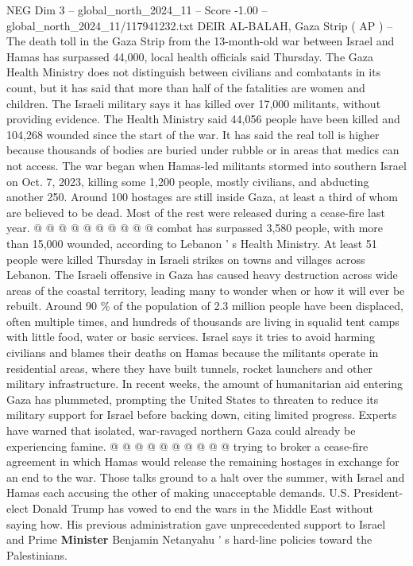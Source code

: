 \begin{textsample}{NEG Dim 3 – global\_north\_2024\_11 – Score -1.00 – global\_north\_2024\_11/117941232.txt}  \label{ex:f3_neg_277}
DEIR AL-BALAH, Gaza Strip ( AP ) -- The death toll in the Gaza Strip from the 13-month-old war between Israel and Hamas has surpassed 44,000, local health officials said Thursday.
The Gaza Health Ministry does not distinguish between civilians and combatants in its count, but it has said that more than half of the fatalities are women and children.
The Israeli military says it has killed over 17,000 militants, without providing evidence.
The Health Ministry said 44,056 people have been killed and 104,268 wounded since the start of the war.
It has said the real toll is higher because thousands of bodies are buried under rubble or in areas that medics can not access.
The war began when Hamas-led militants stormed into southern Israel on Oct. 7, 2023, killing some 1,200 people, mostly civilians, and abducting another 250.
Around 100 hostages are still inside Gaza, at least a third of whom are believed to be dead.
Most of the rest were released during a cease-fire last year. @ @ @ @ @ @ @ @ @ @ combat has surpassed 3,580 people, with more than 15,000 wounded, according to Lebanon ' s Health Ministry.
At least 51 people were killed Thursday in Israeli strikes on towns and villages across Lebanon.
The Israeli offensive in Gaza has caused heavy destruction across wide areas of the coastal territory, leading many to wonder when or how it will ever be rebuilt.
Around 90 \% of the population of 2.3 million people have been displaced, often multiple times, and hundreds of thousands are living in squalid tent camps with little food, water or basic services.
Israel says it tries to avoid harming civilians and blames their deaths on Hamas because the militants operate in residential areas, where they have built tunnels, rocket launchers and other military infrastructure.
In recent weeks, the amount of humanitarian aid entering Gaza has plummeted, prompting the United States to threaten to reduce its military support for Israel before backing down, citing limited progress.
Experts have warned that isolated, war-ravaged northern Gaza could already be experiencing famine. @ @ @ @ @ @ @ @ @ @ trying to broker a cease-fire agreement in which Hamas would release the remaining hostages in exchange for an end to the war.
Those talks ground to a halt over the summer, with Israel and Hamas each accusing the other of making unacceptable demands.
U.S.
President-elect Donald Trump has vowed to end the wars in the Middle East without saying how.
His previous administration gave unprecedented support to Israel and Prime \textbf{Minister} Benjamin Netanyahu ' s hard-line policies toward the Palestinians.

\end{textsample}
